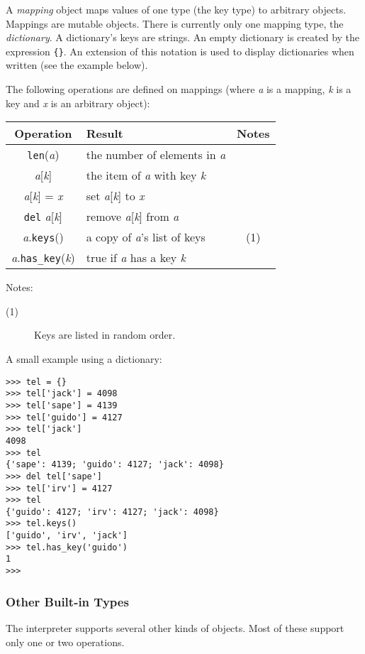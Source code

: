 A
{\em mapping}
object maps values of one type (the key type) to arbitrary objects.
Mappings are mutable objects.
There is currently only one mapping type, the
{\em dictionary}.
A dictionary's keys are strings.
An empty dictionary is created by the expression \verb"{}".
An extension of this notation is used to display dictionaries when
written (see the example below).

The following operations are defined on mappings (where {\em a} is a
mapping, {\em k} is a key and {\em x} is an arbitrary object):

\begin{center}
\begin{tabular}{|c|l|c|}
\hline
Operation & Result & Notes\\
\hline
{\tt len}({\em a}) & the number of elements in {\em a} & \\
{\em a}[{\em k}] & the item of {\em a} with key {\em k} & \\
{\em a}[{\em k}] = {\em x} & set {\em a}[{\em k}] to {\em x} & \\
{\tt del} {\em a}[{\em k}] & remove {\em a}[{\em k}] from {\em a} & \\
{\em a}.{\tt keys}() & a copy of {\em a}'s list of keys & (1) \\
{\em a}.{\tt has\_key}({\em k}) & true if {\em a} has a key {\em k} & \\
\hline
\end{tabular}
\end{center}

\noindent
Notes:
\begin{description}
\item[(1)]
Keys are listed in random order.
\end{description}

A small example using a dictionary:
\bcode\begin{verbatim}
>>> tel = {}
>>> tel['jack'] = 4098
>>> tel['sape'] = 4139
>>> tel['guido'] = 4127
>>> tel['jack']
4098
>>> tel
{'sape': 4139; 'guido': 4127; 'jack': 4098}
>>> del tel['sape']
>>> tel['irv'] = 4127
>>> tel
{'guido': 4127; 'irv': 4127; 'jack': 4098}
>>> tel.keys()
['guido', 'irv', 'jack']
>>> tel.has_key('guido')
1
>>> 
\end{verbatim}\ecode
\subsubsection{Other Built-in Types}

The interpreter supports several other kinds of objects.
Most of these support only one or two operations.

